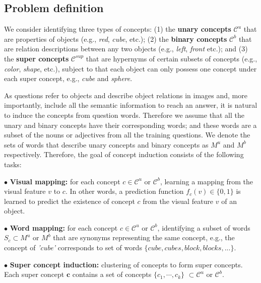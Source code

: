 \documentclass[10pt,twocolumn,letterpaper]{article}
\begin{document}
\subsection{Problem definition}
\vspace{-2mm}
\label{ssec:concept_formulation}
We consider identifying three types of concepts: (1) the \textbf{unary concepts} $\mathcal{C}^u$ that are properties of objects (e.g., \emph{red}, \emph{cube}, etc.); (2) the \textbf{binary concepts} $\mathcal{C}^b$ that are relation descriptions between any two objects (e.g., \emph{left}, \emph{front} etc.); and (3) the \textbf{super concepts} $\mathcal{C}^{sup}$ that are hypernyms of certain subsets of concepts (e.g., \emph{color}, \emph{shape}, etc.), subject to that each object can only possess one concept under each super concept, e.g., \emph{cube} and \emph{sphere}.

As questions refer to objects and describe object relations in images and, more importantly, include all the semantic information to reach an answer, it is natural to induce the concepts from question words. Therefore we assume that all the unary and binary concepts have their corresponding words; and these words are a subset of the nouns or adjectives from all the training questions. We denote the sets of words that describe unary concepts and binary concepts as $M^u$ and $M^b$ respectively. Therefore, the goal of concept induction consists of the following tasks:

\noindent$\bullet$ \textbf{Visual mapping:} for each concept $c \in \mathcal{C}^u$ or $\mathcal{C}^b$, learning a mapping from the visual feature $v$ to $c$. In other words, a prediction function $f_c(v) \in \{0,1\}$ is learned to predict the existence of concept $c$ from the visual feature $v$ of an object.

\noindent$\bullet$ \textbf{Word mapping:} for each concept $c \in \mathcal{C}^u$ or $\mathcal{C}^b$, identifying a subset of words $S_c \subset M^u$ or $M^b$ that are synonyms representing the same concept, e.g., the concept of \emph{'cube'} corresponds to set of words $\{cube, cubes, block, blocks, ...\}$.

\noindent$\bullet$ \textbf{Super concept induction:} clustering of concepts to form super concepts. Each super concept $\mathbf{c}$ contains a set of concepts $\{c_1, \cdots, c_k\}$ $\subset \mathcal{C}^u$ or $\mathcal{C}^b$.
\end{document}
